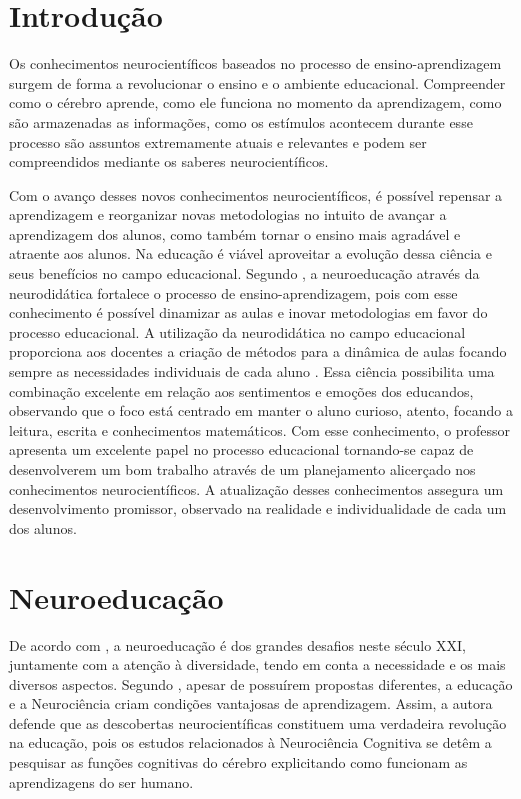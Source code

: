 \documentclass[portuguese]{textolivre}
\begin{document}
\begin{polyabstract}
\begin{english}
\begin{abstract}
\end{abstract}
\end{english}
\end{polyabstract}

\section{Introdução}\label{sec-intro}
Os conhecimentos neurocientíficos baseados no processo de ensino-aprendizagem surgem de forma a revolucionar o ensino e o ambiente educacional. Compreender como o cérebro aprende, como ele funciona no momento da aprendizagem, como são armazenadas as informações, como os estímulos acontecem durante esse processo são assuntos extremamente atuais e relevantes e podem ser compreendidos mediante os saberes neurocientíficos. 

Com o avanço desses novos conhecimentos neurocientíficos, é possível repensar a aprendizagem e reorganizar novas metodologias no intuito de avançar a aprendizagem dos alunos, como também tornar o ensino mais agradável e atraente aos alunos. Na educação é viável aproveitar a evolução dessa ciência e seus benefícios no campo educacional. Segundo \textcite{fernandez_martinez_propuesta_2021}, a neuroeducação através da neurodidática fortalece o processo de ensino-aprendizagem, pois com esse conhecimento é possível dinamizar as aulas e inovar metodologias em favor do processo educacional. A utilização da neurodidática no campo educacional proporciona aos docentes a criação de métodos para a dinâmica de aulas focando sempre as necessidades individuais de cada aluno \cite{molina_formacion_2020}. Essa ciência possibilita uma combinação excelente em relação aos sentimentos e emoções dos educandos, observando que o foco está centrado em manter o aluno curioso, atento, focando a leitura, escrita e conhecimentos matemáticos. Com esse conhecimento, o professor apresenta um excelente papel no processo educacional tornando-se capaz de desenvolverem um bom trabalho através de um planejamento alicerçado nos conhecimentos neurocientíficos. A atualização desses conhecimentos assegura um desenvolvimento promissor, observado na realidade e individualidade de cada um dos alunos.

\section{Neuroeducação}\label{sec-normas}
De acordo com \textcite{hernandez_fernandez_inclusion_2021}, a neuroeducação é dos grandes desafios neste século XXI, juntamente com a atenção à diversidade, tendo em conta a necessidade e os mais diversos aspectos. Segundo \textcite{nascimento_o_2011}, apesar de possuírem propostas diferentes, a educação e a Neurociência criam condições vantajosas de aprendizagem. Assim, a autora defende que as descobertas neurocientíficas constituem uma verdadeira revolução na educação, pois os estudos relacionados à Neurociência Cognitiva se detêm a pesquisar as funções cognitivas do cérebro explicitando como funcionam as aprendizagens do ser humano.
\end{document}
